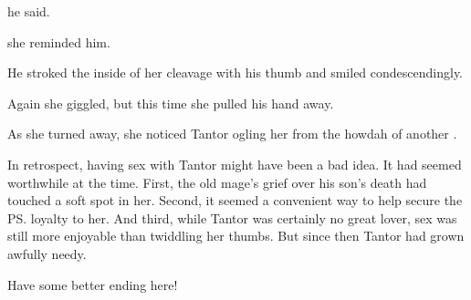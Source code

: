  he said. 

 she reminded him. 

He stroked the inside of her cleavage with his thumb and smiled condescendingly. 

Again she giggled, but this time she pulled his hand away. 

As she turned away, she noticed \Jirad{} Tantor ogling her from the howdah of another \mulgron. 


In retrospect, having sex with Tantor might have been a bad idea. 
It had seemed worthwhile at the time. 
First, the old mage's grief over his son's death had touched a soft spot in her. 
Second, it seemed a convenient way to help secure the \ps{\ishrah} loyalty to her. 
And third, while Tantor was certainly no great lover, sex was still more enjoyable than twiddling her thumbs. 
But since then Tantor had grown awfully needy. 

\new
Have some better ending here!

% 
% 
%   
% 
% 
%   
%   
%   









